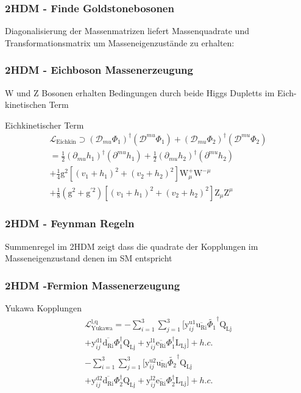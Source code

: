 \documentclass{beamer}
\begin{document}
\begin{frame}
\frametitle{2HDM - Finde Goldstonebosonen}
Diagonalisierung der Massenmatrizen liefert Massenquadrate und Transformationsmatrix um Masseneigenzustände zu erhalten:

\end{frame}
\begin{frame}
\frametitle{2HDM - Eichboson Massenerzeugung}
W und Z Bosonen erhalten Bedingungen durch beide Higgs Dupletts im Eich-kinetischen Term 
\begin{block}{Eichkinetischer Term}
\begin{equation}
\begin{split}
\mathscr{L}_{\text{Eichkin}} \supset (\mathscr{D}_{mu}\Phi_{1})^{\dagger}(\mathscr{D}^{mu}\Phi_{1})+(\mathscr{D}_{mu}\Phi_{2})^{\dagger}(\mathscr{D}^{mu}\Phi_{2}) \\
= \frac{1}{2} (\partial_{mu}h_{1})^{\dagger}(\partial^{mu}h_{1})+\frac{1}{2}(\partial_{mu}h_{2})^{\dagger}(\partial^{mu}h_{2}) \\
+\frac{1}{4} \text{g}^2 [(v_{1}+h_{1})^{2}+(v_{2}+h_{2})^{2}]\text{W}_{\mu}^{+}\text{W}^{-\mu}\\
+\frac{1}{8} (\text{g}^{2}+\text{g}^{\prime2}) [(v_{1}+h_{1})^{2}+(v_{2}+h_{2})^{2}]\text{Z}_{\mu}\text{Z}^{\mu}
\end{split}
\end{equation}
\end{block}
\end{frame}



\begin{frame}
\frametitle{2HDM - Feynman Regeln}

Summenregel im 2HDM zeigt dass die quadrate der Kopplungen im Masseneigenzustand denen im SM entspricht 
\end{frame}

\begin{frame}
\frametitle{2HDM -Fermion Massenerzeugung}
\begin{block}{Yukawa Kopplungen}
\begin{equation}
\begin{split}
\mathscr{L}_{\text{Yukawa}}^{\text{l,q}}=- \sum_{i=1}^{3} \sum_{j=1}^{3} [\text{y}^{\text{u1}}_{ij}\overline{\text{u}_{\text{Ri}}} \tilde{\Phi_{1}}^{\dagger}\text{Q}_{\text{Lj}}\\
+\text{y}^{\text{d1}}_{ij} \overline{\text{d}_{\text{Ri}}}\Phi_{1}^{\dagger} \text{Q}_{\text{Lj}}+\text{y}^{\text{l1}}_{ij} \overline{\text{e}_{\text{Ri}}}\Phi_{1}^{\dagger} \text{L}_{\text{Lj}}]+h.c.\\
- \sum_{i=1}^{3} \sum_{j=1}^{3} [\text{y}^{\text{u2}}_{ij}\overline{\text{u}_{\text{Ri}}} \tilde{\Phi_{2}}^{\dagger}\text{Q}_{\text{Lj}}\\
+\text{y}^{\text{d2}}_{ij} \overline{\text{d}_{\text{Ri}}}\Phi_{2}^{\dagger} \text{Q}_{\text{Lj}}+\text{y}^{\text{l2}}_{ij} \overline{\text{e}_{\text{Ri}}}\Phi_{2}^{\dagger} \text{L}_{\text{Lj}}]+h.c.
\end{split}
\end{equation}
\end{block}
\end{frame}
\end{document}
